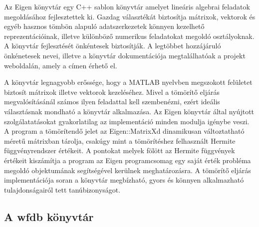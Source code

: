 \documentclass[oneside,titlepage,12pt,a4paper]{report}
\begin{document}
Az Eigen könyvtár egy C++ sablon könyvtár amelyet lineáris algebrai feladatok megoldásához fejlesztettek ki. Gazdag választékát biztosítja mátrixok, vektorok és egyéb hasznos tömbön alapuló adatszerkezetek könnyen kezelhető reprezentációinak, illetve különböző numerikus feladatokat megoldó osztályoknak. A könyvtár fejlesztését önkéntesek biztosítják. A legtöbbet hozzájáruló önkénetesek nevei, illetve a könyvtár dokumentációja megtalálhatóak a projekt weboldalán, amely a \cite{eigenEler} címen érhető el.
\par A könyvtár legnagyobb erőssége, hogy a MATLAB nyelvben megszokott felületet biztosít mátrixok illetve vektorok kezeléséhez. Mivel a tömörítő eljárás megvalósításánál számos ilyen feladattal kell szembenézni, ezért ideális választásnak mondható a könyvtár alkalmazása. Az Eigen könyvtár által nyújtott szolgálatatásokat gyakorlatilag az implementáció minden modulja igénybe veszi. A program a tömörítendő jelet az Eigen::MatrixXd dinamikusan változtatható méretű mátrixban tárolja, csakúgy mint a tömörítéshez felhasznált Hermite függvényrendszer értékeit. A pontokat melyek fölött az Hermite függvények értékeit kiszámítja a program az Eigen programcsomag egy saját érték probléma megoldó objektumának segítségével kerülnek meghatározásra. A tömörítő eljárás implementációja soran a könyvtár megbízható, gyors és könnyen alkalmazható tulajdonságairól tett tanúbizonyságot.

\subsection*{A wfdb könyvtár} 
\end{document}

